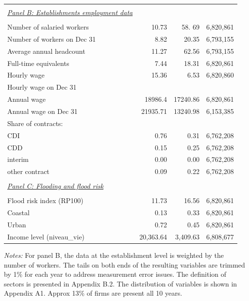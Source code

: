 \begin{table}[htbp]
\begin{threeparttable}
\begin{tabular}{lrrr}
\midrule
\\
\textit{\underline{Panel B: Establishments employment data}} & & & \\
& \\
Number of salaried workers  &  10.73 &  58. 69 & 6,820,861 \\
Number of workers on Dec 31  & 8.82 & 20.35 & 6,793,155 \\
Average annual headcount  & 11.27 & 62.56 & 6,793,155 \\
Full-time equivalents  & 7.44 & 18.31 & 6,820,861 \\
Hourly wage & 15.36 & 6.53 & 6,820,860 \\
Hourly wage on Dec 31  &  &  &  \\
Annual wage  & 18986.4 & 17240.86 & 6,820,861 \\
Annual wage on Dec 31  & 21935.71 & 13240.98 & 6,153,385 \\
Share of contracts: \\ 
\hspace{1em}CDI & 0.76 & 0.31 & 6,762,208 \\
\hspace{1em}CDD & 0.15 & 0.25 & 6,762,208 \\
\hspace{1em}interim & 0.00 & 0.00 & 6,762,208 \\
\hspace{1em}other contract & 0.09 & 0.22 & 6,762,208 \\
\midrule
\\
\textit{\underline{Panel C: Flooding and flood risk}} & & & \\
& \\
Flood risk index (RP100) & 11.73 & 16.56 & 6,820,861 \\
Coastal & 0.13 & 0.33 & 6,820,861 \\
Urban & 0.72 & 0.45 & 6,820,861 \\
Income level (niveau\_vie) & 20,363.64 & 3,409.63 & 6,808,677 \\
\bottomrule
\end{tabular}
\begin{tablenotes}
\small
\item \textit{Notes:} For panel B, the data at the establishment level is weighted by the number of workers. The tails on both ends of the resulting variables are trimmed by 1\% for each year to address measurement error issues. The definition of sectors is presented in Appendix B.2. The distribution of variables is shown in Appendix A1. Approx 13\% of firms are present all 10 years.
\end{tablenotes}
\end{threeparttable}
\end{table}